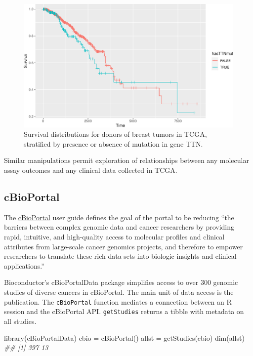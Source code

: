 \documentclass[]{article}
\newcommand{\hlstr}[1]{\textcolor[rgb]{0.251,0.627,0.251}{#1}}%
\newcommand{\hlcom}[1]{\textcolor[rgb]{0.502,0.502,0.502}{\textit{#1}}}%
\newcommand{\hlstd}[1]{\textcolor[rgb]{0.251,0.251,0.251}{#1}}%
\newcommand{\hlkwd}[1]{\textcolor[rgb]{0.878,0.439,0.125}{#1}}%
\newenvironment{Shaded}{\begin{myshaded}}{\end{myshaded}}
\newcommand{\KeywordTok}[1]{\hlkwd{#1}}
\newcommand{\StringTok}[1]{\hlstr{#1}}
\newcommand{\CommentTok}[1]{\hlcom{#1}}
\newcommand{\NormalTok}[1]{\hlstd{#1}}
\begin{document}
\begin{figure}
\includegraphics[width=1\linewidth,]{bioccb_files/figure-latex/strat-1} \caption{Survival distributions for donors of breast tumors in TCGA, stratified by presence or absence of mutation in gene TTN.}\label{fig:strat}
\end{figure}

Similar manipulations permit exploration of relationships between
any molecular assay outcomes and any clinical data collected in TCGA.

\hypertarget{cbioportal}{%
\subsection{cBioPortal}\label{cbioportal}}

The \href{https://www.cbioportal.org/}{cBioPortal} user guide
defines the goal of the portal to be reducing ``the barriers between complex
genomic data and cancer researchers by providing rapid, intuitive, and high-quality
access to molecular profiles and clinical attributes from large-scale cancer genomics projects, and
therefore to empower researchers to translate these rich data sets into biologic insights and clinical applications.''

Bioconductor's cBioPortalData package simplifies access to over 300 genomic studies of
diverse cancers in cBioPortal. The main unit of data access is the publication. The
\texttt{cBioPortal} function mediates a connection between an R session and the
cBioPortal API. \texttt{getStudies} returns a tibble with metadata on
all studies.

\begin{Shaded}
\begin{Highlighting}[]
\KeywordTok{library}\NormalTok{(cBioPortalData)}
\NormalTok{cbio =}\StringTok{ }\KeywordTok{cBioPortal}\NormalTok{()}
\NormalTok{allst =}\StringTok{ }\KeywordTok{getStudies}\NormalTok{(cbio)}
\KeywordTok{dim}\NormalTok{(allst)}
\CommentTok{\#\# [1] 397  13}
\end{Highlighting}
\end{Shaded}
\end{document}
